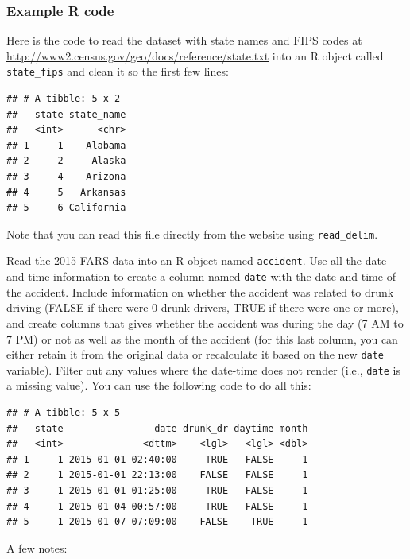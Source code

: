 \documentclass[]{book}
\theoremstyle{definition}
\theoremstyle{definition}
\theoremstyle{definition}
\theoremstyle{remark}
\begin{document}
\subsubsection{Example R code}\label{example-r-code-16}

Here is the code to read the dataset with state names and FIPS codes at
\url{http://www2.census.gov/geo/docs/reference/state.txt} into an R
object called \texttt{state\_fips} and clean it so the first few lines:

\begin{verbatim}
## # A tibble: 5 x 2
##   state state_name
##   <int>      <chr>
## 1     1    Alabama
## 2     2     Alaska
## 3     4    Arizona
## 4     5   Arkansas
## 5     6 California
\end{verbatim}

Note that you can read this file directly from the website using
\texttt{read\_delim}.

Read the 2015 FARS data into an R object named \texttt{accident}. Use
all the date and time information to create a column named \texttt{date}
with the date and time of the accident. Include information on whether
the accident was related to drunk driving (FALSE if there were 0 drunk
drivers, TRUE if there were one or more), and create columns that gives
whether the accident was during the day (7 AM to 7 PM) or not as well as
the month of the accident (for this last column, you can either retain
it from the original data or recalculate it based on the new
\texttt{date} variable). Filter out any values where the date-time does
not render (i.e., \texttt{date} is a missing value). You can use the
following code to do all this:

\begin{verbatim}
## # A tibble: 5 x 5
##   state                date drunk_dr daytime month
##   <int>              <dttm>    <lgl>   <lgl> <dbl>
## 1     1 2015-01-01 02:40:00     TRUE   FALSE     1
## 2     1 2015-01-01 22:13:00    FALSE   FALSE     1
## 3     1 2015-01-01 01:25:00     TRUE   FALSE     1
## 4     1 2015-01-04 00:57:00     TRUE   FALSE     1
## 5     1 2015-01-07 07:09:00    FALSE    TRUE     1
\end{verbatim}

A few notes:
\end{document}
